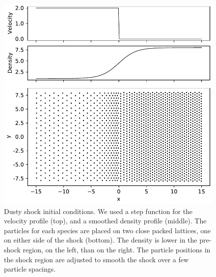 \documentclass[fleqn,usenatbib]{mnras}
\begin{document}
\begin{figure}
   \begin{center}
      \includegraphics[width=\columnwidth]{figs/dustyshock_initial.pdf}
      \caption{Dusty shock initial conditions. We used a step function for the
         velocity profile (top), and a smoothed density profile (middle). The
         particles for each species are placed on two close packed lattices, one
         on either side of the shock (bottom). The density is lower in the
         pre-shock region, on the left, than on the right. The particle
         positions in the shock region are adjusted to smooth the shock over a
         few particle spacings.%
         \label{fig:dustyshock_initial}}
   \end{center}
\end{figure}
\end{document}

